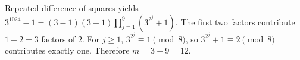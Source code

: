 Repeated difference of squares yields $3^{1024}-1=(3-1)(3+1)\prod_{j=1}^{9}(3^{2^j}+1)$. The first two factors contribute $1+2=3$ factors of $2$. For $j\ge1$, $3^{2^j}\equiv1\pmod8$, so $3^{2^j}+1\equiv2\pmod8$ contributes exactly one. Therefore $m=3+9=\boxed{12}$.
